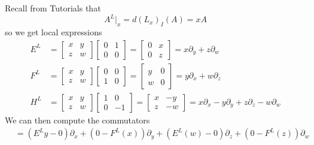 \documentclass[a4paper, 12pt]{article}
\begin{document}
\begin{Exercise}
    Recall from Tutorials that
    \[
        A^L\Big|_x = d(L_x)_I(A) = xA
    \]
    so we get local expressions
    \begin{align*}
        E^L &=
        \begin{bmatrix}
            x & y \\
            z & w
        \end{bmatrix}
        \begin{bmatrix}
            0 & 1 \\
            0 & 0
        \end{bmatrix}
        =
        \begin{bmatrix}
            0 & x \\
            0 & z
        \end{bmatrix}
        = x \partial_y + z \partial_w \\
        F^L &=
        \begin{bmatrix}
            x & y \\
            z & w
        \end{bmatrix}
        \begin{bmatrix}
            0 & 0 \\
            1 & 0
        \end{bmatrix}
        =
        \begin{bmatrix}
            y & 0 \\
            w & 0
        \end{bmatrix}
        = y \partial_x + w \partial_z \\
        H^L &=
        \begin{bmatrix}
            x & y \\
            z & w
        \end{bmatrix}
        \begin{bmatrix}
            1 & 0 \\
            0 & -1
        \end{bmatrix}
        =
        \begin{bmatrix}
            x & -y \\
            z & -w
        \end{bmatrix}
        = x \partial_x - y \partial_y + z \partial_z - w \partial_w
    \end{align*}
    We can then compute the commutators
    \begin{align*}
        [E^L, F^L]
        &= (E^Ly - 0) \partial_x + (0 - F^L(x)) \partial_y + (E^L(w) - 0) \partial_z + (0 - F^L(z)) \partial_w \\

\end{align*}
\end{Exercise}
\end{document}
